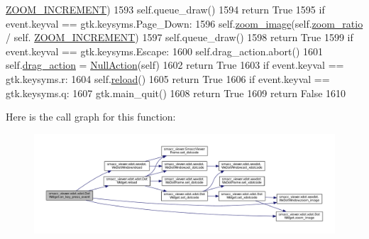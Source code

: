\begin{DoxyCode}
      \hyperlink{classsmacc__viewer_1_1xdot_1_1xdot_1_1DotWidget_a1c0d2875d33064ba8d476e8142b05a0f}{ZOOM\_INCREMENT})
1593             self.queue\_draw()
1594             \textcolor{keywordflow}{return} \textcolor{keyword}{True}
1595         \textcolor{keywordflow}{if} event.keyval == gtk.keysyms.Page\_Down:
1596             self.\hyperlink{classsmacc__viewer_1_1xdot_1_1xdot_1_1DotWidget_a59e85f20fa9e43ffdeb3a3982061ca5d}{zoom\_image}(self.\hyperlink{classsmacc__viewer_1_1xdot_1_1xdot_1_1DotWidget_a61694eba4278e9726bbef68a9ca3f594}{zoom\_ratio} / self.
      \hyperlink{classsmacc__viewer_1_1xdot_1_1xdot_1_1DotWidget_a1c0d2875d33064ba8d476e8142b05a0f}{ZOOM\_INCREMENT})
1597             self.queue\_draw()
1598             \textcolor{keywordflow}{return} \textcolor{keyword}{True}
1599         \textcolor{keywordflow}{if} event.keyval == gtk.keysyms.Escape:
1600             self.drag\_action.abort()
1601             self.\hyperlink{classsmacc__viewer_1_1xdot_1_1xdot_1_1DotWidget_a767a18a13a9581e3e7afd20bf0842856}{drag\_action} = \hyperlink{classsmacc__viewer_1_1xdot_1_1xdot_1_1NullAction}{NullAction}(self)
1602             \textcolor{keywordflow}{return} \textcolor{keyword}{True}
1603         \textcolor{keywordflow}{if} event.keyval == gtk.keysyms.r:
1604             self.\hyperlink{classsmacc__viewer_1_1xdot_1_1xdot_1_1DotWidget_ad65916bccc16b7a559ced00059d1f256}{reload}()
1605             \textcolor{keywordflow}{return} \textcolor{keyword}{True}
1606         \textcolor{keywordflow}{if} event.keyval == gtk.keysyms.q:
1607             gtk.main\_quit()
1608             \textcolor{keywordflow}{return} \textcolor{keyword}{True}
1609         \textcolor{keywordflow}{return} \textcolor{keyword}{False}
1610 
\end{DoxyCode}


Here is the call graph for this function\+:
\nopagebreak
\begin{figure}[H]
\begin{center}
\leavevmode
\includegraphics[width=350pt]{classsmacc__viewer_1_1xdot_1_1xdot_1_1DotWidget_a7ba7befbc2da3494a94bcfcc8a09b2ce_cgraph}
\end{center}
\end{figure}


